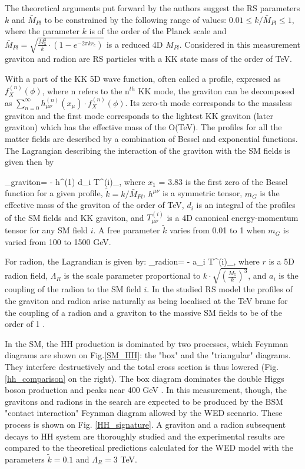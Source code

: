 The theoretical arguments 	put forward by the authors \cite{Davoudiasl:1999jd} suggest the RS parameters $k$ and $\bar{M}_{Pl}$ to be constrained by the following range of values: $0.01 \leq k / \bar{M}_{Pl} \leq 1$, where the parameter $k$ is of the order of the Planck scale and $\bar{M}_{Pl} = \sqrt{\frac{M^3_5}{k} \cdot (1 - e^{-2\pi k r_c} ) }$ is a reduced 4D $M_{Pl}$. Considered in this measurement graviton and radion are RS particles with a KK state mass of the order of TeV. 

With a part of the KK 5D wave function, often called a profile, expressed as $f^{(n)}_X(\phi)$, where n refers to the n$^{th}$ KK mode, the graviton can be decomposed as $\sum_{n=0}^{\infty} h^{(n)}_{\mu\nu}(x_\mu) \cdot f^{(n)}_X(\phi)$. Its zero-th mode corresponds to the massless graviton and the first mode corresponds to the lightest KK graviton (later graviton) which has the effective mass of the O(TeV). The profiles for all the matter fields are described by a combination of Bessel and exponential functions. The Lagrangian describing the interaction of the graviton with the SM fields is given then by 

\beqn\label{lagr_graviton}
\Lagr_{graviton}=  -  h^{\mu\nu(1)} \times d_i T^{(i)}_{\mu\nu},  
\eeqn
where $x_1$ = 3.83 is the first zero of the Bessel function for a given profile, $\tilde{k}  = k / \bar{M}_{Pl}$, $h^{\mu\nu}$ is a symmetric tensor, $m_G$ is the effective mass of the graviton of the order of TeV, $d_i$ is an integral of the profiles of the SM fields and KK graviton, and  $T^{(i)}_{\mu\nu}$ is a 4D canonical energy-momentum tensor \cite{Forger:2003ut} for any SM field $i$. A free parameter $\tilde{k}$ varies from 0.01 to 1 when $m_{G}$ is varied from 100 to 1500 GeV. 

For radion, the Lagrandian is given by:
\beqn\label{lagr_radion}
\Lagr_{radion}=  -  \times a_i T^{\mu (i)}_{\mu},  
\eeqn
where $r$ is a 5D radion field, $\Lambda_R$ is the scale parameter proportional to $k \cdot \sqrt{ ( \frac{M_5}{k} )^3}$, and $a_i$ is the coupling of the radion to the SM field $i$. In the studied RS model the profiles of the graviton and radion arise naturally as being localised at the TeV brane for the coupling of a radion and a graviton to the massive SM fields to be of the order of 1 \cite{WED}. 


In the SM, the HH production is dominated by two processes, which Feynman diagrams are shown on Fig.\ref{SM_HH}: the "box" and the "triangular" diagrams. They interfere destructively and the total cross section is thus lowered (Fig. \ref{hh_comparison} on the right). The box diagram dominates the double Higgs boson production and peaks near 400 GeV \cite{Chen:2014xra}. In this measurement, though, the gravitons and radions in the search are expected to be produced by the BSM "contact interaction" Feynman diagram allowed by the WED scenario. These process is shown on Fig. \ref{HH_signature}.  A graviton and a radion subsequent decays to HH system are thoroughly studied and the experimental results are compared to the theoretical predictions calculated for the WED model with the parameters $\tilde{k}=0.1$ and $\Lambda_R = 3 $ TeV.  


